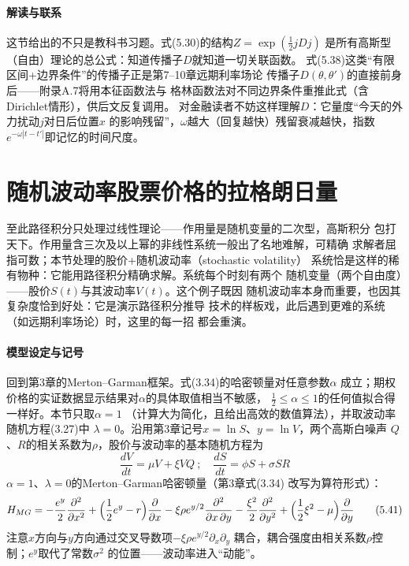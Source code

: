 \paragraph{解读与联系}
这节给出的不只是教科书习题。式(5.30)的结构$Z=\exp(\frac{1}{2}jDj)$
是所有高斯型（自由）理论的总公式：知道传播子$D$就知道一切关联函数。
式(5.38)这类“有限区间+边界条件”的传播子正是第7--10章远期利率场论
传播子$D(\theta,\theta')$的直接前身后——附录A.7将用本征函数法与
格林函数法对不同边界条件重推此式（含Dirichlet情形），供后文反复调用。
对金融读者不妨这样理解$D$：它量度“今天的外力扰动$j$对日后位置$x$
的影响残留”，$\omega$越大（回复越快）残留衰减越快，指数
$e^{-\omega|t-t'|}$即记忆的时间尺度。

\section{随机波动率股票价格的拉格朗日量}

至此路径积分只处理过线性理论——作用量是随机变量的二次型，高斯积分
包打天下。作用量含三次及以上幂的非线性系统一般出了名地难解，可精确
求解者屈指可数；本节处理的股价+随机波动率（stochastic volatility）
系统恰是这样的稀有物种：它能用路径积分精确求解。系统每个时刻有两个
随机变量（两个自由度）——股价$S(t)$与其波动率$V(t)$。这个例子既因
随机波动率本身而重要，也因其复杂度恰到好处：它是演示路径积分推导
技术的样板戏，此后遇到更难的系统（如远期利率场论）时，这里的每一招
都会重演。

\paragraph{模型设定与记号}
回到第3章的Merton--Garman框架。式(3.34)的哈密顿量对任意参数$\alpha$
成立；期权价格的实证数据显示结果对$\alpha$的具体取值相当不敏感，
$\frac{1}{2}\leq\alpha\leq1$的任何值拟合得一样好。本节只取$\alpha=1$
（计算大为简化，且给出高效的数值算法），并取波动率随机方程(3.27)中
$\lambda=0$。沿用第3章记号$x=\ln S$、$y=\ln V$，两个高斯白噪声
$Q$、$R$的相关系数为$\rho$，股价与波动率的基本随机方程为
\begin{equation*}
\frac{dV}{dt}=\mu V+\xi VQ\ ;\quad
\frac{dS}{dt}=\phi S+\sigma SR
\tag{5.40}
\end{equation*}
$\alpha=1$、$\lambda=0$的Merton--Garman哈密顿量（第3章式(3.34)
改写为算符形式）：
\begin{align*}
H_{MG}=-\frac{e^{y}}{2}\frac{\partial^{2}}{\partial x^{2}}
+\Bigl(\frac{1}{2}e^{y}-r\Bigr)\frac{\partial}{\partial x}
-\xi\rho e^{y/2}\frac{\partial^{2}}{\partial x\,\partial y}
-\frac{\xi^{2}}{2}\frac{\partial^{2}}{\partial y^{2}}
+\Bigl(\frac{1}{2}\xi^{2}-\mu\Bigr)\frac{\partial}{\partial y}
\tag{5.41}
\end{align*}
注意$x$方向与$y$方向通过交叉导数项$-\xi\rho e^{y/2}\partial_{x}\partial_{y}$
耦合，耦合强度由相关系数$\rho$控制；$e^{y}$取代了常数$\sigma^{2}$
的位置——波动率进入“动能”。

